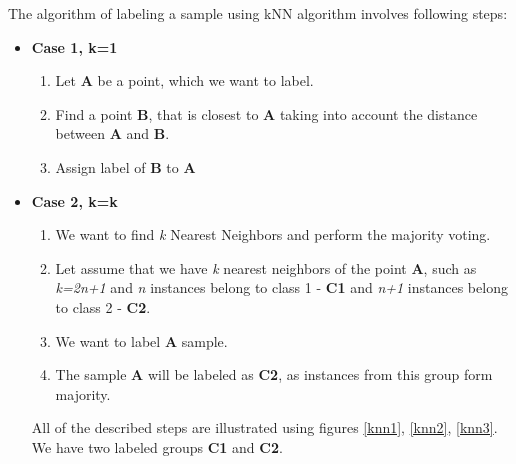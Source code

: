 	The algorithm of labeling a sample using kNN algorithm involves following steps:
	\begin{itemize}
		\item \textbf{Case 1, k=1}
		
		\begin{enumerate}
			\item Let \textbf{A} be a point, which we want to label.
			\item Find a point \textbf{B}, that is closest to \textbf{A} taking into account the distance between \textbf{A} and \textbf{B}.
			\item Assign label of \textbf{B} to \textbf{A}
			
		\end{enumerate}
		
		\item \textbf{Case 2, k=k}
		\begin{enumerate}
			\item We want to find \textit{k} Nearest Neighbors and perform the majority voting.
			\item Let assume that we have \textit{k} nearest neighbors of the point \textbf{A}, such as \textit{k=2n+1} and \textit{n} instances belong to class 1 - \textbf{C1} and \textit{n+1} instances belong to class 2 - \textbf{C2}.
			\item We want to label \textbf{A} sample.
			\item The sample \textbf{A} will be labeled as \textbf{C2}, as instances from this group form majority.
		\end{enumerate}
		All of the described steps are illustrated using figures \ref{knn1}, \ref{knn2}, \ref{knn3}.
		We have two labeled groups \textbf{C1} and \textbf{C2}. 
		

\end{itemize}

